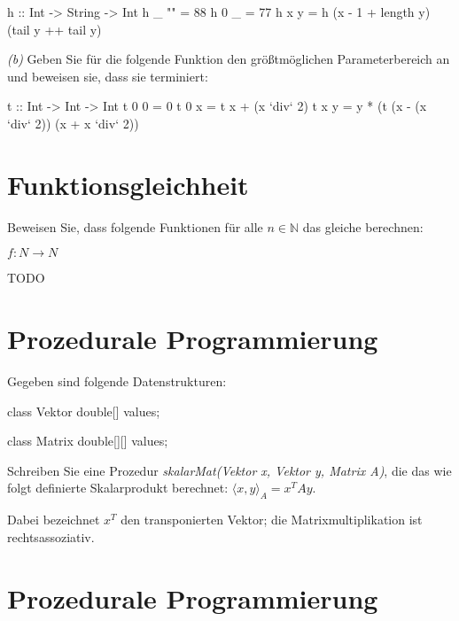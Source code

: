 \documentclass[11pt,a4paper,oneside,ngerman]{scrbook}
\begin{document}
\begin{code}
  h :: Int -> String -> Int
  h _ "" = 88
  h 0 _ = 77
  h x y = h (x - 1 + length y) (tail y ++ tail y)
\end{code}


\emph{(b)} Geben Sie für die folgende Funktion den größtmöglichen Parameterbereich an und beweisen sie, dass sie terminiert:

\begin{code}
t :: Int -> Int -> Int
t 0 0 = 0
t 0 x = t x + (x `div` 2)
t x y = y * (t (x - (x `div` 2)) (x + x `div` 2))
\end{code}

\newpage

\section{Funktionsgleichheit}
Beweisen Sie, dass folgende Funktionen für alle $n \in \mathbb{N}$ das gleiche berechnen:

$f: N \rightarrow N$

TODO

\newpage

\section{Prozedurale Programmierung}
Gegeben sind folgende Datenstrukturen:

\begin{code}
class Vektor {
  double[] values;
}

class Matrix {
  double[][] values;
}
\end{code}

Schreiben Sie eine Prozedur \emph{skalarMat(Vektor x, Vektor y, Matrix A)}, die das wie folgt definierte Skalarprodukt berechnet: $\langle x, y\rangle_A  =  x^TAy$.

Dabei bezeichnet $x^T$ den transponierten Vektor; die Matrixmultiplikation ist rechtsassoziativ.

\begin{code}
  double skalarMat(Vektor x, Vektor y, Matrix A) {
    
  
\end{code}

\newpage

\section{Prozedurale Programmierung}
\end{document}
